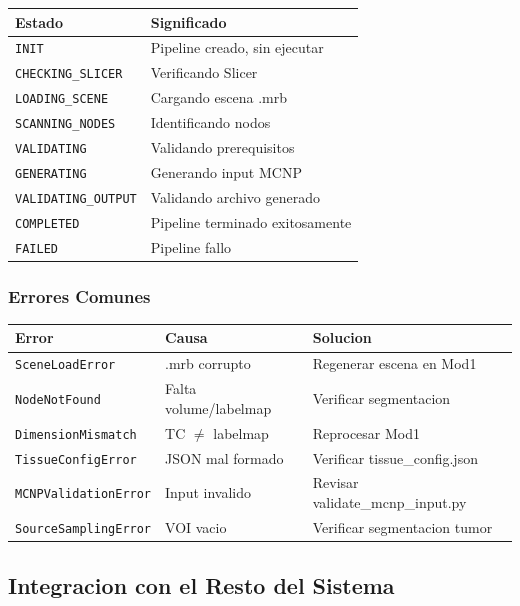 \documentclass[12pt,a4paper]{article}
\begin{document}
\begin{center}
\begin{tabular}{ll}
\toprule
\textbf{Estado} & \textbf{Significado} \\
\midrule
\texttt{INIT} & Pipeline creado, sin ejecutar \\
\texttt{CHECKING\_SLICER} & Verificando Slicer \\
\texttt{LOADING\_SCENE} & Cargando escena .mrb \\
\texttt{SCANNING\_NODES} & Identificando nodos \\
\texttt{VALIDATING} & Validando prerequisitos \\
\texttt{GENERATING} & Generando input MCNP \\
\texttt{VALIDATING\_OUTPUT} & Validando archivo generado \\
\texttt{COMPLETED} & Pipeline terminado exitosamente \\
\texttt{FAILED} & Pipeline fallo \\
\bottomrule
\end{tabular}
\end{center}

\subsubsection{Errores Comunes}

\begin{center}
\begin{tabular}{lll}
\toprule
\textbf{Error} & \textbf{Causa} & \textbf{Solucion} \\
\midrule
\texttt{SceneLoadError} & .mrb corrupto & Regenerar escena en Mod1 \\
\texttt{NodeNotFound} & Falta volume/labelmap & Verificar segmentacion \\
\texttt{DimensionMismatch} & TC $\neq$ labelmap & Reprocesar Mod1 \\
\texttt{TissueConfigError} & JSON mal formado & Verificar tissue\_config.json \\
\texttt{MCNPValidationError} & Input invalido & Revisar validate\_mcnp\_input.py \\
\texttt{SourceSamplingError} & VOI vacio & Verificar segmentacion tumor \\
\bottomrule
\end{tabular}
\end{center}

\subsection{Integracion con el Resto del Sistema}
\end{document}
